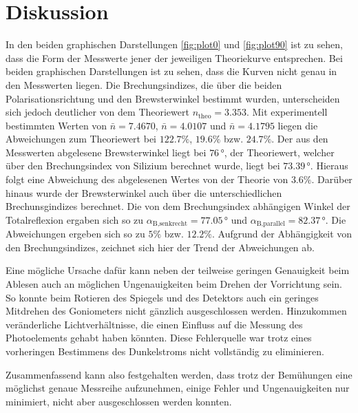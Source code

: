 \section{Diskussion}
\label{sec:Diskussion}

In den beiden graphischen Darstellungen \autoref{fig:plot0} und \autoref{fig:plot90} ist zu sehen, dass die Form der Messwerte jener der jeweiligen Theoriekurve entsprechen. Bei beiden graphischen Darstellungen ist zu sehen, dass die Kurven nicht genau in den Messwerten liegen.
Die Brechungsindizes, die über die beiden Polarisationsrichtung und den Brewsterwinkel bestimmt wurden, unterscheiden sich jedoch deutlicher von dem Theoriewert $n_{\text{theo}}=3.353$. Mit
experimentell bestimmten Werten von $\bar{n}=7.4670$, $\bar{n}= 4.0107$ und $\bar{n}= 4.1795$ liegen die Abweichungen zum Theoriewert bei $122.7\%$,  $19.6\%$ bzw. $24.7\%$. 
Der aus den Messwerten abgelesene Brewsterwinkel liegt bei $76\, °$, der Theoriewert, welcher über den Brechungsindex von Silizium berechnet wurde, liegt bei $73.39\, °$. Hieraus folgt eine Abweichung des abgelesenen Wertes von der Theorie von $3.6 \%$.
Darüber hinaus wurde der Brewsterwinkel auch über die unterschiedlichen Brechunsgindizes berechnet. Die von dem Brechungsindex abhängigen Winkel der Totalreflexion ergaben sich so zu $\alpha_{\text{B,senkrecht}}=77.05\, °$ und $\alpha_{\text{B,parallel}}=82.37\, °$.
Die Abweichungen ergeben sich so zu $5 \%$ bzw. $12.2\%$. Aufgrund der Abhängigkeit von den Brechungsindizes, zeichnet sich hier der Trend der Abweichungen ab.

Eine mögliche Ursache dafür kann neben der teilweise geringen
Genauigkeit beim Ablesen auch an möglichen Ungenauigkeiten beim Drehen der Vorrichtung sein. So konnte beim Rotieren des Spiegels und des Detektors auch ein geringes Mitdrehen des Goniometers nicht gänzlich ausgeschlossen werden.
Hinzukommen veränderliche Lichtverhältnisse, die einen Einfluss auf die Messung des Photoelements gehabt haben könnten. Diese Fehlerquelle war trotz eines vorheringen Bestimmens des Dunkelstroms nicht vollständig zu eliminieren.

Zusammenfassend kann also festgehalten werden, dass trotz der Bemühungen eine möglichst genaue Messreihe aufzunehmen, einige Fehler und Ungenauigkeiten nur minimiert, nicht aber ausgeschlossen werden konnten.